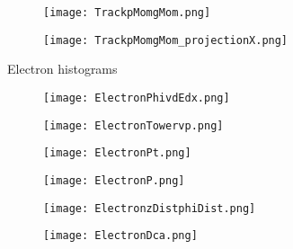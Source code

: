 \documentclass{beamer}
\begin{document}
\begin{frame}
  \begin{figure}[h!]
  \centering
  \texttt{[image: TrackpMomgMom.png]}
  \end{figure}
\end{frame}

\begin{frame}
  \begin{figure}[h!]
  \centering
  \texttt{[image: TrackpMomgMom\_projectionX.png]}
  \end{figure}
\end{frame}

\begin{frame}
  \begin{center}
 	\Huge Electron histograms
 	\end{center}
\end{frame}

\begin{frame}
  \begin{figure}[h!]
  \centering
  \texttt{[image: ElectronPhivdEdx.png]}
  \end{figure}
\end{frame}

\begin{frame}
  \begin{figure}[h!]
  \centering
  \texttt{[image: ElectronTowervp.png]}
  \end{figure}
\end{frame}

\begin{frame}
  \begin{figure}[h!]
  \centering
  \texttt{[image: ElectronPt.png]}
  \end{figure}
\end{frame}

\begin{frame}
  \begin{figure}[h!]
  \centering
  \texttt{[image: ElectronP.png]}
  \end{figure}
\end{frame}

\begin{frame}
  \begin{figure}[h!]
  \centering
  \texttt{[image: ElectronzDistphiDist.png]}
  \end{figure}
\end{frame}

\begin{frame}
  \begin{figure}[h!]
  \centering
  \texttt{[image: ElectronDca.png]}
  \end{figure}
\end{frame}
\end{document}
